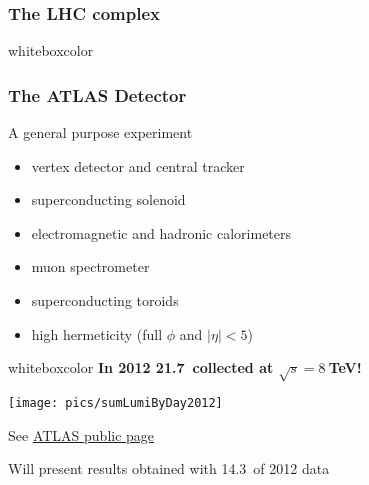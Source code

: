 

\begin{frame}\frametitle{The LHC complex}
\footnotesize\centering
\begin{minipage}{.9\textwidth}
\pause
\begin{beamercolorbox}[wd=.99\textwidth,rounded=true,shadow=true]{whiteboxcolor}\centering\scriptsize

\end{beamercolorbox}

\end{minipage}

\myskip

\end{frame}



\begin{frame}\frametitle{The ATLAS Detector}
\footnotesize\centering

\footnotesize
\begin{minipage}{.35\textwidth}
A general purpose experiment
\begin{itemize}
\item vertex detector and central tracker
\item superconducting solenoid
\item electromagnetic and hadronic calorimeters
\item muon spectrometer
\item superconducting toroids
\item high hermeticity (full $\phi$ and $|\eta|<5$)
\end{itemize}
\end{minipage}\begin{minipage}{.6\textwidth}\centering\pause
\hspace{2cm}\begin{beamercolorbox}[wd=.9\textwidth,rounded=true,shadow=true]{whiteboxcolor}\centering
{\bfseries In 2012 21.7\ifb\  collected at $\sqrt{s}=8~$TeV!}
\vspace{.3cm}

\texttt{[image: pics/sumLumiByDay2012]}

\vspace{\baselineskip}
\end{beamercolorbox}

See \href{https://twiki.cern.ch/twiki/bin/view/AtlasPublic}{ATLAS public page}

\end{minipage}

\myskip
Will present results obtained with \alert{14.3\ifb}\ of 2012 data

\end{frame}
